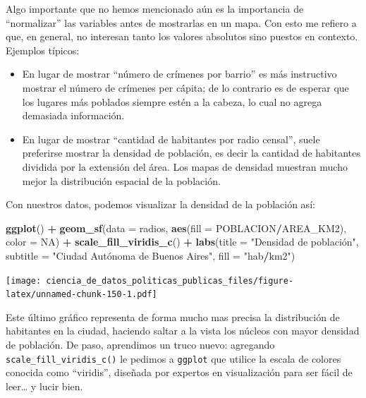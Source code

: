 \documentclass[]{book}
\newenvironment{Shaded}{\begin{snugshade}}{\end{snugshade}}
\newcommand{\KeywordTok}[1]{\textcolor[rgb]{0.13,0.29,0.53}{\textbf{#1}}}
\newcommand{\DataTypeTok}[1]{\textcolor[rgb]{0.13,0.29,0.53}{#1}}
\newcommand{\StringTok}[1]{\textcolor[rgb]{0.31,0.60,0.02}{#1}}
\newcommand{\OtherTok}[1]{\textcolor[rgb]{0.56,0.35,0.01}{#1}}
\newcommand{\OperatorTok}[1]{\textcolor[rgb]{0.81,0.36,0.00}{\textbf{#1}}}
\newcommand{\NormalTok}[1]{#1}
\providecommand{\tightlist}{%
  \setlength{\itemsep}{0pt}\setlength{\parskip}{0pt}}
\begin{document}
Algo importante que no hemos mencionado aún es la importancia de
``normalizar'' las variables antes de mostrarlas en un mapa. Con esto me
refiero a que, en general, no interesan tanto los valores absolutos sino
puestos en contexto. Ejemplos típicos:

\begin{itemize}
\tightlist
\item
  En lugar de mostrar ``número de crímenes por barrio'' es más
  instructivo mostrar el número de crímenes per cápita; de lo contrario
  es de esperar que los lugares más poblados siempre estén a la cabeza,
  lo cual no agrega demasiada información.\\
\item
  En lugar de mostrar ``cantidad de habitantes por radio censal'', suele
  preferirse mostrar la densidad de población, es decir la cantidad de
  habitantes dividida por la extensión del área. Los mapas de densidad
  muestran mucho mejor la distribución espacial de la población.
\end{itemize}

Con nuestros datos, podemos visualizar la densidad de la población así:

\begin{Shaded}
\begin{Highlighting}[]
\KeywordTok{ggplot}\NormalTok{() }\OperatorTok{+}\StringTok{ }
\StringTok{    }\KeywordTok{geom_sf}\NormalTok{(}\DataTypeTok{data =}\NormalTok{ radios, }\KeywordTok{aes}\NormalTok{(}\DataTypeTok{fill =}\NormalTok{ POBLACION}\OperatorTok{/}\NormalTok{AREA_KM2), }\DataTypeTok{color =} \OtherTok{NA}\NormalTok{) }\OperatorTok{+}
\StringTok{    }\KeywordTok{scale_fill_viridis_c}\NormalTok{() }\OperatorTok{+}
\StringTok{    }\KeywordTok{labs}\NormalTok{(}\DataTypeTok{title =} \StringTok{"Densidad de población",}
\StringTok{         subtitle = "}\NormalTok{Ciudad Autónoma de Buenos Aires}\StringTok{",}
\StringTok{         fill = "}\NormalTok{hab}\OperatorTok{/}\NormalTok{km2}\StringTok{")}
\end{Highlighting}
\end{Shaded}

\texttt{[image: ciencia\_de\_datos\_politicas\_publicas\_files/figure-latex/unnamed-chunk-150-1.pdf]}

Este último gráfico representa de forma mucho mas precisa la
distribución de habitantes en la ciudad, haciendo saltar a la vista los
núcleos con mayor densidad de población. De paso, aprendimos un truco
nuevo: agregando \texttt{scale\_fill\_viridis\_c()} le pedimos a
\texttt{ggplot} que utilice la escala de colores conocida como
``viridis'', diseñada por expertos en visualización para ser fácil de
leer\ldots{} y lucir bien.
\end{document}
